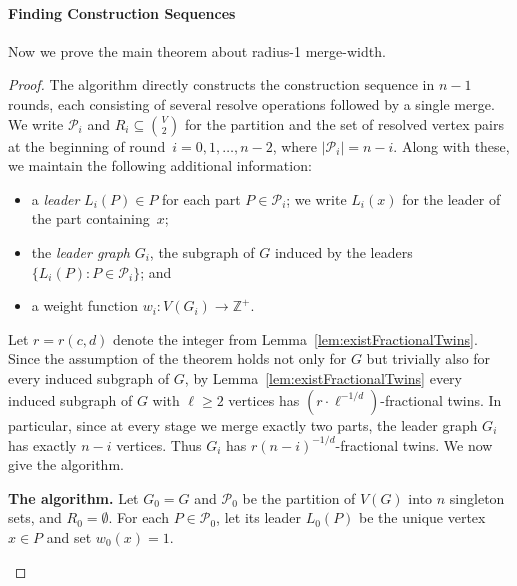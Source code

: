 \documentclass[11pt]{article}
\theoremstyle{definition}
\renewcommand{\geq}{\geqslant}
\renewcommand{\subset}{\subseteq}
\renewcommand{\cal}{\mathcal}
\newcommand{\Pp}{\mathcal{P}}
\begin{document}
\paragraph{Finding Construction Sequences}

Now we prove the main theorem about radius-1 merge-width.

\mergeWidth* \begin{proof} 

    The algorithm directly constructs the construction sequence in $n-1$ rounds, each consisting of several resolve operations followed by a single merge. We write $\Pp_i$ and $R_i\subset {V\choose 2}$ for the partition and the set of resolved vertex pairs at the beginning of round~$i=0,1,\ldots,n-2$, where $|\cal P_i|=n-i$. Along with these, we maintain the following additional information:
    \begin{itemize}
    \item a \emph{leader} $L_i(P) \in P$ for each part $P \in \Pp_i$; we write $L_i(x)$ for the leader of the part containing~$x$;
    \item the \emph{leader graph} $G_i$, the subgraph of $G$ induced by the leaders $\{L_i(P): P \in \Pp_i\}$; and
    \item a weight function $w_i\colon V(G_i) \rightarrow \mathbb{Z}^+$.
    \end{itemize}
    
    Let $r=r(c,d)$ denote the integer from Lemma~\ref{lem:existFractionalTwins}. Since the assumption of the theorem holds not only for $G$ but trivially also for every induced subgraph of $G$, by Lemma~\ref{lem:existFractionalTwins} every induced subgraph of $G$ with $\ell\geq 2$ vertices has $(r \cdot \ell^{-1/d})$-fractional twins. In particular, since at every stage we merge exactly two parts, the leader graph $G_i$ has exactly $n-i$ vertices. Thus $G_i$ has $r(n-i)^{-1/d}$-fractional twins. We now give the algorithm.

    \begin{tcolorbox}[breakable, enhanced, colback=black!5, colframe=black!40, boxrule=0.5pt, left=6pt, right=6pt, top=6pt, bottom=6pt]
    \noindent\textbf{The algorithm.} Let $G_0=G$ and $\mathcal{P}_0$ be the partition of $V(G)$ into $n$ singleton sets, and $R_0=\emptyset$. For each $P \in \mathcal{P}_0$, let its leader $L_0(P)$ be the unique vertex $x \in P$ and set $w_0(x)=1$. 

    \medskip


\end{tcolorbox}
\end{proof}
\end{document}
